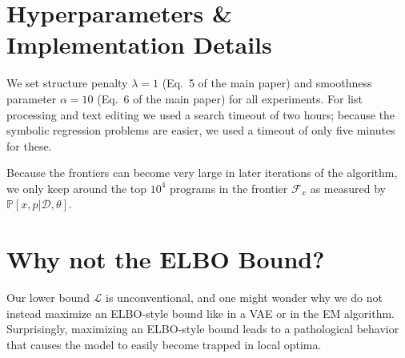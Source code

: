 \documentclass{article}
\newcommand{\lowerBound}{\mathscr{L}}
\newcommand{\probability}{\mathds{P}} %
\begin{document}
\begin{comment}
    range & $\mathbb{Z} \to$ [$\mathbb{Z}$] \\
    sort & $\left[\mathbb{Z}\right] \to \left[\mathbb{Z}\right]$ \\
    \hline
    sum & $\left[\mathbb{Z}\right] \to \mathbb{Z}$ \\
    reverse & $\left[\alpha\right] \to \left[\alpha\right]$ \\
    all & $(\alpha \to$ bool$) \to \left[\alpha\right] \to$ bool \\
    any & $(\alpha \to$ bool$) \to \left[\alpha\right] \to$ bool \\
    index & $\mathbb{Z} \to \left[\alpha\right] \to \alpha$ \\
    filter & $(\alpha \to$ bool$) \to \left[\alpha\right] \to \left[\alpha\right]$ \\
    slice & $\mathbb{Z} \to \mathbb{Z} \to \left[\alpha\right] \to \left[\alpha\right]$ \\
  \hline
\end{tabular}
\end{center}
  \end{comment}

\section{Hyperparameters \& Implementation Details}
We set structure penalty $\lambda = 1$ (Eq.~5 of the main paper) and
smoothness parameter $\alpha = 10$ (Eq.~6 of the main paper)
for all experiments.
For list processing and text editing we used a search timeout of two hours;
because the symbolic regression problems are easier,
we used a timeout of only five minutes for these.


Because the frontiers can become very large in later iterations of the algorithm,
we only keep around the top $10^4$ programs in the frontier $\mathcal{F}_x$ as measured by $\probability[x,p|\mathcal{D},\theta]$.




\section{Why not the ELBO Bound?}

Our lower bound $\lowerBound$ is unconventional,
and one might wonder why we do not instead maximize an ELBO-style bound like in a VAE or in the EM algorithm.
Surprisingly, maximizing an ELBO-style bound
leads to a pathological behavior that  causes the model to easily become trapped in local optima.
\end{document}

